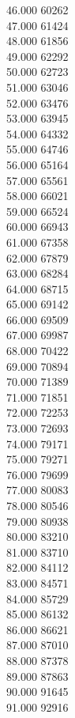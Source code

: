 { 46.000	60262 \\
 47.000	61424 \\
 48.000	61856 \\
 49.000	62292 \\
 50.000	62723 \\
 51.000	63046 \\
 52.000	63476 \\
 53.000	63945 \\
 54.000	64332 \\
 55.000	64746 \\
 56.000	65164 \\
 57.000	65561 \\
 58.000	66021 \\
 59.000	66524 \\
 60.000	66943 \\
 61.000	67358 \\
 62.000	67879 \\
 63.000	68284 \\
 64.000	68715 \\
 65.000	69142 \\
 66.000	69509 \\
 67.000	69987 \\
 68.000	70422 \\
 69.000	70894 \\
 70.000	71389 \\
 71.000	71851 \\
 72.000	72253 \\
 73.000	72693 \\
 74.000	79171 \\
 75.000	79271 \\
 76.000	79699 \\
 77.000	80083 \\
 78.000	80546 \\
 79.000	80938 \\
 80.000	83210 \\
 81.000	83710 \\
 82.000	84112 \\
 83.000	84571 \\
 84.000	85729 \\
 85.000	86132 \\
 86.000	86621 \\
 87.000	87010 \\
 88.000	87378 \\
 89.000	87863 \\
 90.000	91645 \\
 91.000	92916 \\
}
